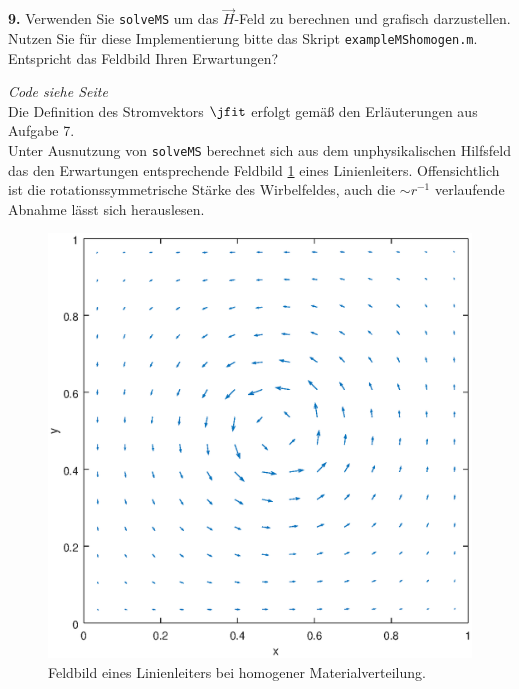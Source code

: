 \documentclass[./Protokollheft.tex]{subfiles}
\begin{document}
 \label{v4.PA.9}
\begin{framed}
	\noindent \textbf{9.} Verwenden Sie \lstinline{solveMS} um das $\vec{H}$-Feld zu berechnen und grafisch darzustellen. Nutzen Sie für diese Implementierung bitte das Skript \lstinline{exampleMShomogen.m}. Entspricht das Feldbild Ihren Erwartungen?\label{exer:visualizeHfield}
\end{framed}

\textit{ Code siehe Seite \pageref{code4.9} } \\
Die Definition des Stromvektors $\jfit$ erfolgt gemäß den Erläuterungen aus Aufgabe 7.
\\
Unter Ausnutzung von \lstinline{solveMS} berechnet sich aus dem unphysikalischen Hilfsfeld das den Erwartungen entsprechende Feldbild \ref{fig:V4.PA9} eines Linienleiters. Offensichtlich ist die rotationssymmetrische Stärke des Wirbelfeldes, auch die $ \sim r^{-1} $ verlaufende Abnahme lässt sich herauslesen. 
\begin{figure}[hp]
\begin{center}
\includegraphics[scale=0.7]{eps/plotMShomogen}
\end{center}
\caption{Feldbild eines Linienleiters bei homogener Materialverteilung.}
\label{fig:V4.PA9}
\end{figure}
\end{document}
